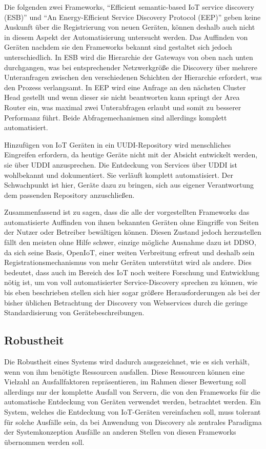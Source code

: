 \documentclass[conference,compsoc]{IEEEtran}
\begin{document}
Die folgenden zwei Frameworks, \enquote{Efficient semantic-based IoT service discovery (ESB)} und \enquote{An Energy-Efficient Service Discovery Protocol (EEP)} geben keine Auskunft über die Registrierung von neuen Geräten, können deshalb auch nicht in diesem Aspekt der Automatisierung untersucht werden. Das Auffinden von Geräten nachdem sie den Frameworks bekannt sind gestaltet sich jedoch unterschiedlich. In ESB wird die Hierarchie der Gateways von oben nach unten durchgangen, was bei entsprechender Netzwerkgröße die Discovery über mehrere Unteranfragen zwischen den verschiedenen Schichten der Hierarchie erfordert, was den Prozess verlangsamt. In EEP wird eine Anfrage an den nächsten Cluster Head gestellt und wenn dieser sie nicht beantworten kann springt der Area Router ein, was maximal zwei Unterabfragen erlaubt und somit zu besserer Performanz führt. Beide Abfragemechanismen sind allerdings komplett automatisiert.

Hinzufügen von IoT Geräten in ein UUDI-Repository wird menschliches Eingreifen erfordern, da heutige Geräte nicht mit der Absicht entwickelt werden, sie über UDDI anzusprechen. Die Entdeckung von Services über UDDI ist wohlbekannt und dokumentiert. Sie verläuft komplett automatisiert. Der Schwachpunkt ist hier, Geräte dazu zu bringen, sich aus eigener Verantwortung dem passenden Repository anzuschließen.

Zusammenfassend ist zu sagen, dass die alle der vorgestellten Frameworks das automatisierte Auffinden von ihnen bekannten Geräten ohne Eingriffe von Seiten der Nutzer oder Betreiber bewältigen können. Diesen Zustand jedoch herzustellen fällt den meisten ohne Hilfe schwer, einzige mögliche Ausnahme dazu ist DDSO, da sich seine Basis, OpenIoT, einer weiten Verbreitung erfreut und deshalb sein Registrationsmechanismus von mehr Geräten unterstützt wird als andere. Dies bedeutet, dass auch im Bereich des IoT noch weitere Forschung und Entwicklung nötig ist, um von voll automatisierter Service-Discovery sprechen zu können, wie bis eben beschrieben stellen sich hier sogar größere Herausforderungen als bei der bisher üblichen Betrachtung der Discovery von Webservices durch die geringe Standardisierung von Gerätebeschreibungen.

\subsection{Robustheit}

Die Robustheit eines Systems wird dadurch ausgezeichnet, wie es sich verhält, wenn von ihm benötigte Ressourcen ausfallen. Diese Ressourcen können eine Vielzahl an Ausfallfaktoren repräsentieren, im Rahmen dieser Bewertung soll allerdings nur der komplette Ausfall von Servern, die von den Frameworks für die automatische Entdeckung von Geräten verwendet werden, betrachtet werden. Ein System, welches die Entdeckung von IoT-Geräten vereinfachen soll, muss tolerant für solche Ausfälle sein, da bei Anwendung von Discovery als zentrales Paradigma der Systemkonzeption Ausfälle an anderen Stellen von diesen Frameworks übernommen werden soll.
\end{document}
